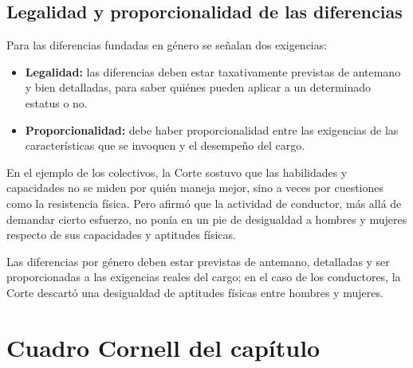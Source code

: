 \documentclass[12pt,oneside]{book}
\begin{document}
\subsection{Legalidad y proporcionalidad de las diferencias}

Para las diferencias fundadas en género se señalan dos exigencias:
\begin{itemize}
    \item \textbf{Legalidad:} las diferencias deben estar taxativamente previstas de antemano y bien detalladas, para saber quiénes pueden aplicar a un determinado estatus o no.
    \item \textbf{Proporcionalidad:} debe haber proporcionalidad entre las exigencias de las características que se invoquen y el desempeño del cargo.
\end{itemize}

En el ejemplo de los colectivos, la Corte sostuvo que las habilidades y capacidades no se miden por quién maneja mejor, sino a veces por cuestiones como la resistencia física. Pero afirmó que la actividad de conductor, más allá de demandar cierto esfuerzo, no ponía en un pie de desigualdad a hombres y mujeres respecto de sus capacidades y aptitudes físicas.

\begin{important}
Las diferencias por género deben estar previstas de antemano, detalladas y ser proporcionadas a las exigencias reales del cargo; en el caso de los conductores, la Corte descartó una desigualdad de aptitudes físicas entre hombres y mujeres.
\end{important}

\section{Cuadro Cornell del capítulo}
\end{document}
